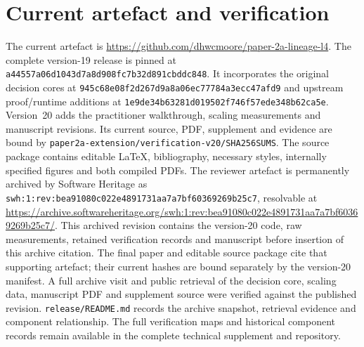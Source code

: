 \documentclass[smallextended,envcountsect,envcountsame,natbib]{svjour3}
\begin{document}
\section{Current artefact and verification}\label{ex:app:verification}
\label{ex:app:extension}\label{ex:app:mechanisation}

The current artefact is \url{https://github.com/dhwcmoore/paper-2a-lineage-l4}. The complete version-19 release is pinned at \nolinkurl{a44557a06d1043d7a8d908fc7b32d891cbddc848}. It incorporates the original decision cores at \nolinkurl{945c68e08f2d267d9a8a06ec77784a3ecc47afd9} and upstream proof/runtime additions at \nolinkurl{1e9de34b63281d019502f746f57ede348b62ca5e}. Version~20 adds the practitioner walkthrough, scaling measurements and manuscript revisions. Its current source, PDF, supplement and evidence are bound by \nolinkurl{paper2a-extension/verification-v20/SHA256SUMS}. The source package contains editable LaTeX, bibliography, necessary styles, internally specified figures and both compiled PDFs. The reviewer artefact is permanently archived by Software Heritage as \nolinkurl{swh:1:rev:bea91080c022e4891731aa7a7bf60369269b25c7}, resolvable at \url{https://archive.softwareheritage.org/swh:1:rev:bea91080c022e4891731aa7a7bf60369269b25c7/}. This archived revision contains the version-20 code, raw measurements, retained verification records and manuscript before insertion of this archive citation. The final paper and editable source package cite that supporting artefact; their current hashes are bound separately by the version-20 manifest. A full archive visit and public retrieval of the decision core, scaling data, manuscript PDF and supplement source were verified against the published revision. \nolinkurl{release/README.md} records the archive snapshot, retrieval evidence and component relationship. The full verification maps and historical component records remain available in the complete technical supplement and repository.
\end{document}

